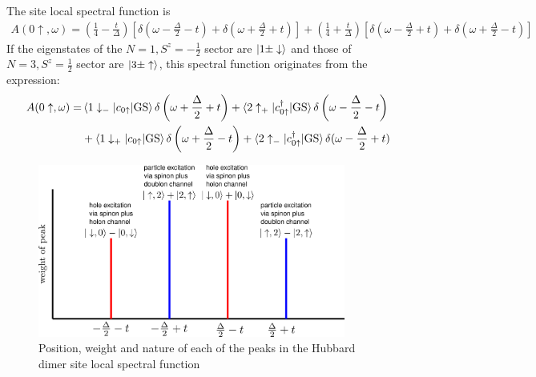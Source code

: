 \documentclass[reprint,hidelinks]{revtex4-2}
\begin{document}
\begin{widetext}
The site local spectral function is
\begin{equation}\begin{aligned}
	A(0\uparrow, \omega) = \left( \frac{1}{4} - \frac{t}{\Delta} \right)\left[\delta(\omega - \frac{\Delta}{2} - t) + \delta(\omega + \frac{\Delta}{2} + t)\right]\nonumber + \left( \frac{1}{4} + \frac{t}{\Delta} \right) \left[\delta(\omega - \frac{\Delta}{2} + t) + \delta(\omega + \frac{\Delta}{2} - t)\right]
\end{aligned}\end{equation}
If the eigenstates of the $N=1, S^z = - \frac{1}{2}$ sector are $\ket{1 \pm \downarrow}$ and those of $N=3, S^z = \frac{1}{2}$ sector are $\ket{3 \pm \uparrow}$, this spectral function originates from the expression:
\begin{equation}\begin{aligned}
	A(0\uparrow, \omega) =& \braket{1 \downarrow_- | c_{0 \uparrow} | \text{GS}} \delta\left(\omega + \frac{\Delta}{2} + t\right) + \braket{2 \uparrow_+ | c^\dagger_{0 \uparrow} | \text{GS}}\delta\left(\omega - \frac{\Delta}{2} - t\right) \\
			      &+ \braket{1 \downarrow_+ | c_{0 \uparrow} | \text{GS}}\delta\left(\omega + \frac{\Delta}{2} - t\right) + \braket{2 \uparrow_- | c^\dagger_{0 \uparrow} | \text{GS}}\delta(\omega - \frac{\Delta}{2} + t)
\end{aligned}\end{equation}
\begin{figure}[!htb]
	\centering
	\includegraphics[width=0.9\textwidth]{dimer-peaks.png}
	\caption{Position, weight and nature of each of the peaks in the Hubbard dimer site local spectral function}
\end{figure}


\end{widetext}
\end{document}
